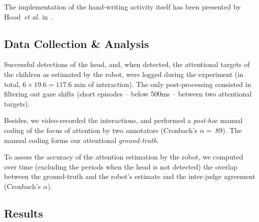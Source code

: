 \documentclass{sig-alternate}
\newcommand{\etal}{\textit{et al.}\xspace}
\begin{document}
The implementation of the hand-writing activity itself has been presented by
Hood~\etal in~\cite{Hood:2015}.

\subsection{Data Collection \& Analysis}

Successful detections of the head, and, when detected, the attentional targets of
the children as estimated by the robot, were logged during the experiment (in
total, $6\times19.6=117.6$ min of interaction). The only post-processing
consisted in filtering out gaze shifts (short episodes -- below 500ms -- between
two attentional targets).

Besides, we video-recorded the interactions, and performed a {\it post-hoc}
manual coding of the focus of attention by two annotators (Cronbach's
$\alpha=.89$).
The manual coding forms our attentional \emph{ground-truth}.

To assess the accuracy of the attention estimation by the robot, we computed
over time (excluding the periods when the head is not detected) the
overlap between the ground-truth and the robot's estimate and the
inter-judge agreement (Cronbach's $\alpha$).


\subsection{Results}
\end{document}
